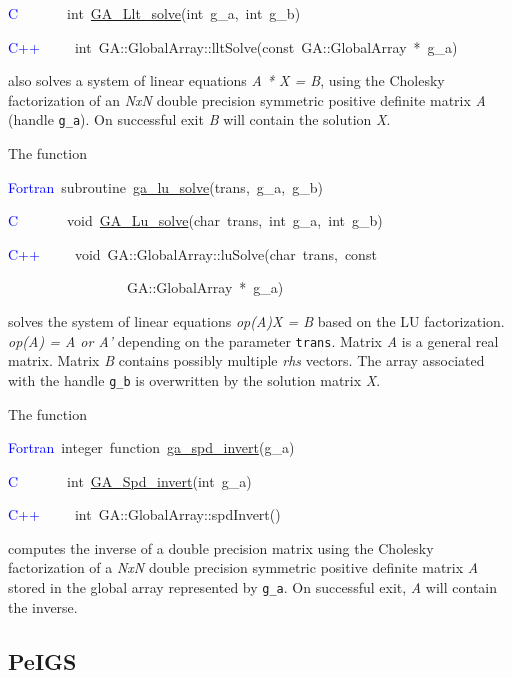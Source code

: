\textcolor{blue}{C}~~~~~~~int~\href{https://hpc.pnl.gov/globalarrays/api/c_op_api.html\#ga_llt_solve}{GA\_{}Llt\_{}solve}(int~g\_a,~int~g\_b)

\textcolor{blue}{C++}~~~~~int~GA::GlobalArray::lltSolve(const~GA::GlobalArray~{*}~g\_a)

also solves a system of linear equations \emph{A {*} X = B}, using
the Cholesky factorization of an \emph{NxN} double precision symmetric
positive definite matrix \emph{A} (handle \texttt{g\_a}). On successful
exit \emph{B} will contain the solution \emph{X}.

The function

\textcolor{blue}{Fortran}~subroutine~\href{https://hpc.pnl.gov/globalarrays/api/f_op_api.html\#ga_lu_solve}{ga\_{}lu\_{}solve}(trans,~g\_a,~g\_b)~

\textcolor{blue}{C}~~~~~~~void~\href{https://hpc.pnl.gov/globalarrays/api/c_op_api.html\#ga_lu_solve}{GA\_{}Lu\_{}solve}(char~trans,~int~g\_a,~int~g\_b)~

\textcolor{blue}{C++}~~~~~void~GA::GlobalArray::luSolve(char~trans,~const~

~~~~~~~~~~~~~~~~~GA::GlobalArray~{*}~g\_a)

solves the system of linear equations\emph{ op(A)X = B} based on the
LU factorization. \emph{op(A) = A or A'} depending on the parameter
\texttt{trans}. Matrix\emph{ A} is a general real matrix. Matrix \emph{B}
contains possibly multiple \emph{rhs} vectors. The array associated
with the handle \texttt{g\_b} is overwritten by the solution matrix
\emph{X}.

The function

\textcolor{blue}{Fortran}~integer~function~\href{https://hpc.pnl.gov/globalarrays/api/f_op_api.html\#ga_spd_invert}{ga\_{}spd\_{}invert}(g\_a)~

\textcolor{blue}{C}~~~~~~~int~\href{https://hpc.pnl.gov/globalarrays/api/c_op_api.html\#ga_spd_invert}{GA\_{}Spd\_{}invert}(int~g\_a)~

\textcolor{blue}{C++}~~~~~int~GA::GlobalArray::spdInvert()

computes the inverse of a double precision matrix using the Cholesky
factorization of a \emph{NxN }double precision symmetric positive
definite matrix \emph{A} stored in the global array represented by
\texttt{g\_a}. On successful exit, \emph{A} will contain the inverse. 


\subsection{PeIGS }

